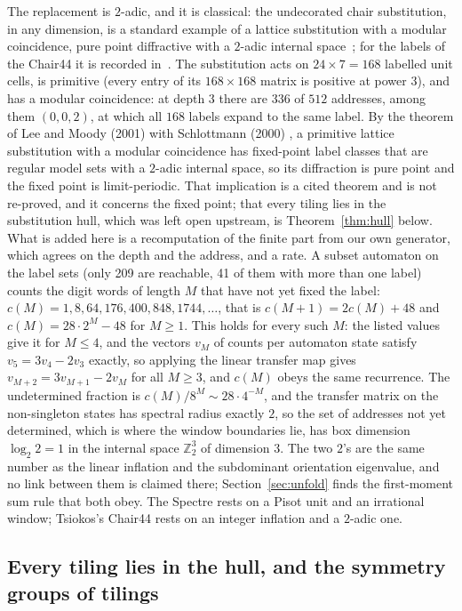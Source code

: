 \documentclass[11pt]{article}
\theoremstyle{definition}
\theoremstyle{remark}
\begin{document}
The replacement is $2$-adic, and it is classical: the undecorated chair substitution, in any dimension, is a
standard example of a lattice substitution with a modular coincidence, pure point diffractive with a $2$-adic internal
space~\cite{LeeMoody,BMS}; for the labels of the Chair44 it is recorded in~\cite[Thm~8.1]{Tsiokos1}.  The substitution acts on $24\times7=168$ labelled unit cells, is primitive
(every entry of its $168\times168$ matrix is positive at power $3$), and has a modular
coincidence: at depth $3$ there are 336 of $512$ addresses, among them $(0,0,2)$, at which
all $168$ labels expand to the same label.  By the theorem of Lee and Moody (2001) with
Schlottmann (2000) \cite{LeeMoody,Schlottmann,LMS}, a primitive lattice substitution with a modular
coincidence has fixed-point label classes that are regular model sets with a $2$-adic internal
space, so its diffraction is pure point and the fixed point is limit-periodic.  That implication
is a cited theorem and is not re-proved, and it concerns the fixed point; that every tiling lies in the
substitution hull, which was left open upstream, is Theorem~\ref{thm:hull} below.  What is added here is a recomputation of the finite part from our own
generator, which agrees on the depth and the address, and a rate.  A subset automaton on the label
sets (only 209 are reachable, 41 of them with more than one label) counts the digit words
of length $M$ that have not yet fixed the label:
$c(M)=1,8,64,176,400,848,1744,\dots$, that is $c(M+1)=2c(M)+48$ and $c(M)=28\cdot2^{M}-48$
for $M\ge1$.  This holds for every such $M$: the listed values give it for $M\le4$, and the vectors $v_{M}$ of counts per automaton state satisfy
$v_{5}=3v_{4}-2v_{3}$ exactly, so applying the linear transfer map gives $v_{M+2}=3v_{M+1}-2v_{M}$ for all
$M\ge3$, and $c(M)$ obeys the same recurrence.  The undetermined fraction
is $c(M)/8^{M}\sim28\cdot4^{-M}$, and the transfer matrix on the non-singleton states has
spectral radius exactly $2$, so the set of addresses not yet determined, which is where the
window boundaries lie, has box dimension $\log_{2}2=1$ in the internal space $\mathbb{Z}_{2}^{3}$
of dimension $3$.  The two $2$'s are the same number as the linear inflation and the
subdominant orientation eigenvalue, and no link between them is claimed there; Section~\ref{sec:unfold} finds the first-moment sum rule that both obey.  The Spectre rests on
a Pisot unit and an irrational window; Tsiokos's Chair44 rests on an integer inflation and a $2$-adic one.


\subsection{Every tiling lies in the hull, and the symmetry groups of tilings}
\label{sec:hull}
\end{document}
